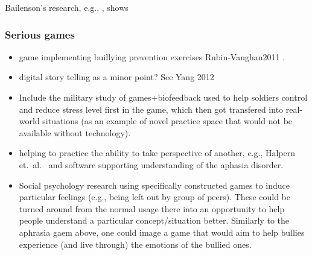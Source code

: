 \documentclass[prodmode,acmtochi]{acmsmall}
\newcommand{\todo}[1]{\textrm{\textrm{\textcolor{LightBlue}{[[#1]]}}}}
\begin{document}
\iffalse
                        \item Bailenson's research, e.g., \cite{Bailenson2005,Bailenson2008}, shows 
\subsubsection{Serious games}
\begin{itemize}
                        \item game implementing buillying prevention exercises Rubin-Vaughan2011 \cite{Rubin-Vaughan2011}. 
                \item digital story telling as a minor point? See Yang 2012 \cite{Yang2012}
                        \item Include the military study of games+biofeedback used to help soldiers control and reduce stress level first in the game, which then got transfered into real-world situations \cite{Bouchard2012} (as an example of novel practice space that would not be available without technology). 
                        \item helping to practice the ability to take perspective of another, e.g., Halpern et.~al.~ \cite{Hailpern2011} and software supporting understanding of the aphasia disorder.
                        \item Social psychology research using specifically constructed games to induce particular feelings (e.g., being left out by group of peers). These could be turned around from the normal usage there into an opportunity to help people understand a particular concept/situation better. Similarly to the aphrasia gaem above, one could image a game that would aim to help bullies experience (and live through) the emotions of the bullied ones. 
 
\end{itemize}
\end{document}
